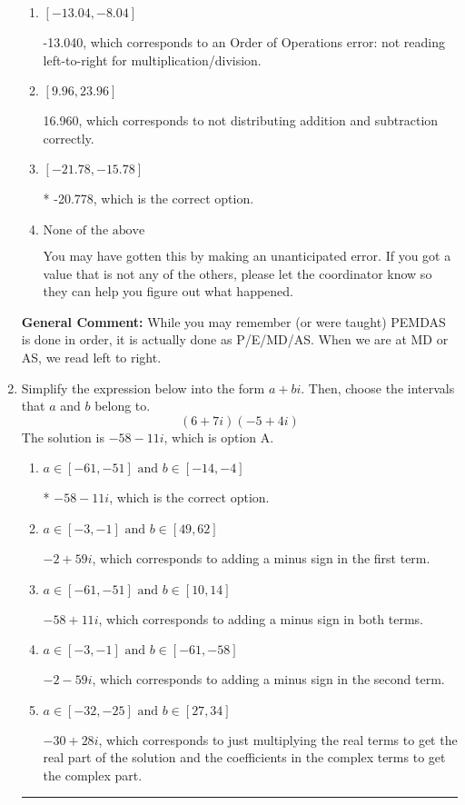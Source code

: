 \documentclass{extbook}[14pt]
\newcommand{\litem}[1]{\item #1

\rule{\textwidth}{0.4pt}}
\begin{document}
\begin{enumerate}
{\begin{enumerate}[label=\Alph*.]
 -101.667, which corresponds to not distributing a negative correctly.
\item \( [-13.04, -8.04] \)

 -13.040, which corresponds to an Order of Operations error: not reading left-to-right for multiplication/division.
\item \( [9.96, 23.96] \)

 16.960, which corresponds to not distributing addition and subtraction correctly.
\item \( [-21.78, -15.78] \)

* -20.778, which is the correct option.
\item \( \text{None of the above} \)

 You may have gotten this by making an unanticipated error. If you got a value that is not any of the others, please let the coordinator know so they can help you figure out what happened.
\end{enumerate}

\textbf{General Comment:} While you may remember (or were taught) PEMDAS is done in order, it is actually done as P/E/MD/AS. When we are at MD or AS, we read left to right.
}
\litem{
Simplify the expression below into the form $a+bi$. Then, choose the intervals that $a$ and $b$ belong to.
\[ (6 + 7 i)(-5 + 4 i) \]
The solution is \( -58 - 11 i \), which is option A.\begin{enumerate}[label=\Alph*.]
\item \( a \in [-61, -51] \text{ and } b \in [-14, -4] \)

* $-58 - 11 i$, which is the correct option.
\item \( a \in [-3, -1] \text{ and } b \in [49, 62] \)

 $-2 + 59 i$, which corresponds to adding a minus sign in the first term.
\item \( a \in [-61, -51] \text{ and } b \in [10, 14] \)

 $-58 + 11 i$, which corresponds to adding a minus sign in both terms.
\item \( a \in [-3, -1] \text{ and } b \in [-61, -58] \)

 $-2 - 59 i$, which corresponds to adding a minus sign in the second term.
\item \( a \in [-32, -25] \text{ and } b \in [27, 34] \)

 $-30 + 28 i$, which corresponds to just multiplying the real terms to get the real part of the solution and the coefficients in the complex terms to get the complex part.
\end{enumerate}

}
\end{enumerate}
\end{document}
